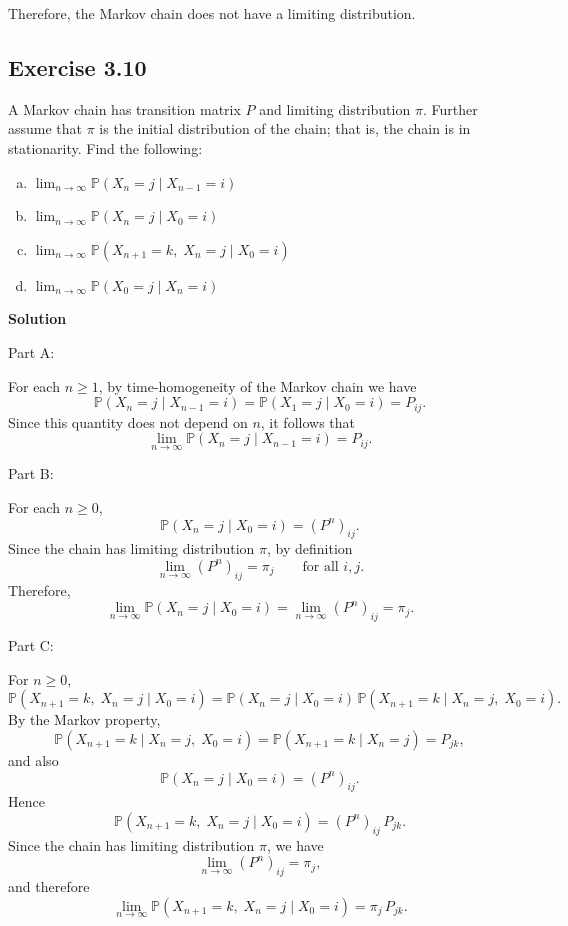 \documentclass[hidelinks]{article}
\begin{document}
\noindent Therefore, the Markov chain does not have a limiting distribution.

\subsection{Exercise 3.10}

A Markov chain has transition matrix $P$ and limiting distribution $\pi$.
Further assume that $\pi$ is the initial distribution of the chain; that is,
the chain is in stationarity. Find the following:
\begin{enumerate}[(a)]
\item $\displaystyle \lim_{n\to\infty} \mathbb{P}(X_n = j \mid X_{n-1} = i)$
\item $\displaystyle \lim_{n\to\infty} \mathbb{P}(X_n = j \mid X_0 = i)$
\item $\displaystyle \lim_{n\to\infty} \mathbb{P}(X_{n+1} = k,\; X_n = j \mid X_0 = i)$
\item $\displaystyle \lim_{n\to\infty} \mathbb{P}(X_0 = j \mid X_n = i)$
\end{enumerate}

\noindent \textbf{Solution}

\noindent Part A:

\noindent For each $n\ge 1$, by time-homogeneity of the Markov chain we have
\[
\mathbb{P}(X_n=j \mid X_{n-1}=i)
=
\mathbb{P}(X_1=j \mid X_0=i)
= P_{ij}.
\]
Since this quantity does not depend on $n$, it follows that
\[
\lim_{n\to\infty}\mathbb{P}(X_n=j \mid X_{n-1}=i)=P_{ij}.
\]

\noindent Part B:

\noindent For each $n\ge 0$,
\[
\mathbb{P}(X_n=j \mid X_0=i) = (P^n)_{ij}.
\]
Since the chain has limiting distribution $\pi$, by definition
\[
\lim_{n\to\infty} (P^n)_{ij} = \pi_j \qquad \text{for all } i,j.
\]
Therefore,
\[
\lim_{n\to\infty}\mathbb{P}(X_n=j \mid X_0=i)
=
\lim_{n\to\infty}(P^n)_{ij}
=
\pi_j.
\]

\noindent Part C:

\noindent For $n\ge 0$,
\[
\mathbb{P}(X_{n+1}=k,\;X_n=j \mid X_0=i)
=
\mathbb{P}(X_n=j \mid X_0=i)\,
\mathbb{P}(X_{n+1}=k \mid X_n=j,\;X_0=i).
\]
By the Markov property,
\[
\mathbb{P}(X_{n+1}=k \mid X_n=j,\;X_0=i)
=
\mathbb{P}(X_{n+1}=k \mid X_n=j)
= P_{jk},
\]
and also
\[
\mathbb{P}(X_n=j \mid X_0=i) = (P^n)_{ij}.
\]
Hence
\[
\mathbb{P}(X_{n+1}=k,\;X_n=j \mid X_0=i)=(P^n)_{ij}\,P_{jk}.
\]
Since the chain has limiting distribution $\pi$, we have
\[
\lim_{n\to\infty}(P^n)_{ij}=\pi_j,
\]
and therefore
\[
\lim_{n\to\infty}\mathbb{P}(X_{n+1}=k,\;X_n=j \mid X_0=i)
=
\pi_j\,P_{jk}.
\]
\end{document}
